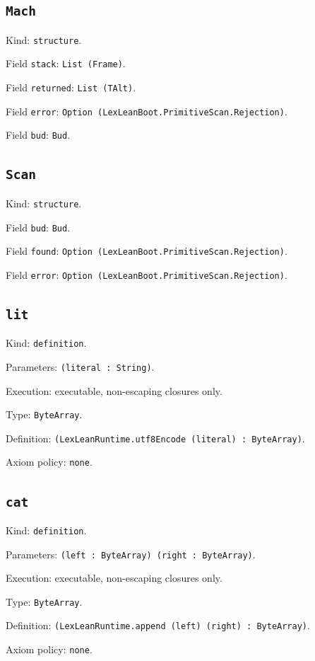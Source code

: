 \documentclass[11pt]{article}
\begin{document}
\subsection*{\texttt{Mach}}
\noindent Kind: \texttt{structure}.\par
\noindent Field \texttt{stack}: \texttt{List (Frame)}.\par
\noindent Field \texttt{returned}: \texttt{List (TAlt)}.\par
\noindent Field \texttt{error}: \texttt{Option (LexLeanBoot.PrimitiveScan.Rejection)}.\par
\noindent Field \texttt{bud}: \texttt{Bud}.\par
\subsection*{\texttt{Scan}}
\noindent Kind: \texttt{structure}.\par
\noindent Field \texttt{bud}: \texttt{Bud}.\par
\noindent Field \texttt{found}: \texttt{Option (LexLeanBoot.PrimitiveScan.Rejection)}.\par
\noindent Field \texttt{error}: \texttt{Option (LexLeanBoot.PrimitiveScan.Rejection)}.\par
\subsection*{\texttt{lit}}
\noindent Kind: \texttt{definition}.\par
\noindent Parameters: \texttt{(literal : String)}.\par
\noindent Execution: executable, non-escaping closures only.\par
\noindent Type: \texttt{ByteArray}.\par
\noindent Definition: \texttt{(LexLeanRuntime.utf8Encode (literal) : ByteArray)}.\par
\noindent Axiom policy: \texttt{none}.\par
\subsection*{\texttt{cat}}
\noindent Kind: \texttt{definition}.\par
\noindent Parameters: \texttt{(left : ByteArray) (right : ByteArray)}.\par
\noindent Execution: executable, non-escaping closures only.\par
\noindent Type: \texttt{ByteArray}.\par
\noindent Definition: \texttt{(LexLeanRuntime.append (left) (right) : ByteArray)}.\par
\noindent Axiom policy: \texttt{none}.\par
\end{document}
